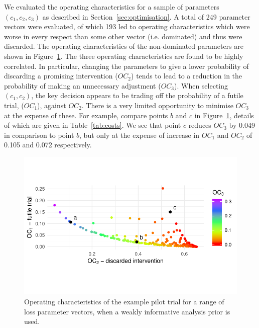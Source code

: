 \documentclass{article} %
\begin{document}

We evaluated the operating characteristics for a sample of parameters $(c_1, c_2, c_3)$ as described in Section~\ref{sec:optimisation}. A total of 249 parameter vectors were evaluated, of which 193 led to operating characteristics which were worse in every respect than some other vector (i.e. dominated) and thus were discarded. The operating characteristics of the non-dominated parameters are shown in Figure~\ref{fig:p_front}. The three operating characteristics are found to be highly correlated. In particular, changing the parameters to give a lower probability of discarding a promising intervention ($OC_2$) tends to lead to a reduction in the probability of making an unnecessary adjustment ($OC_3$). When selecting $(c_1, c_2)$, the key decision appears to be trading off the probability of a futile trial, ($OC_{1}$), against $OC_{2}$. There is a very limited opportunity to minimise $OC_{3}$ at the expense of these. For example, compare points $b$ and $c$ in Figure~\ref{fig:p_front}, details of which are given in Table~\ref{tab:costs}. We see that point $c$ reduces $OC_3$ by 0.049 in comparison to point $b$, but only at the expense of increase in $OC_1$ and $OC_2$ of 0.105 and 0.072 respectively.

\begin{figure}
\centering
\includegraphics[scale=0.8]{./Figures/p_front}
\caption{Operating characteristics of the example pilot trial for a range of loss parameter vectors, when a weakly informative analysis prior is used.}
\label{fig:p_front}
\end{figure}
\end{document}
